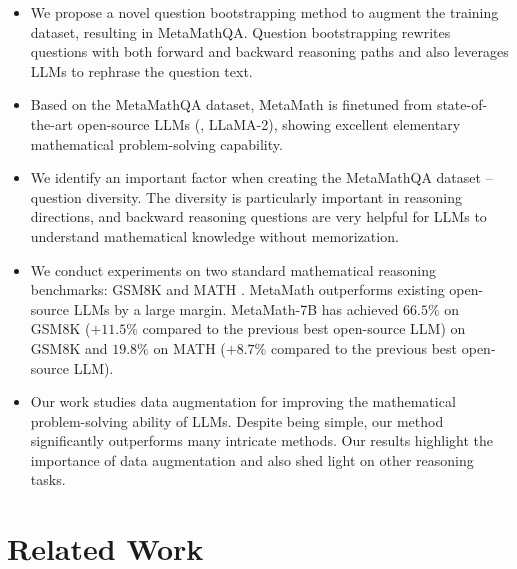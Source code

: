     \begin{itemize}[leftmargin=*,nosep]
    \setlength\itemsep{0.28em}
        \item We propose a novel question bootstrapping method to augment the training dataset, resulting in MetaMathQA. Question bootstrapping rewrites questions with both forward and backward reasoning paths and also leverages LLMs to rephrase the question text.
        \item Based on the MetaMathQA dataset, MetaMath is finetuned from state-of-the-art open-source LLMs (\eg, LLaMA-2), showing excellent elementary mathematical problem-solving capability.
        \item We identify an important factor when creating the MetaMathQA dataset -- question diversity. The diversity is particularly important in reasoning directions, and backward reasoning questions are very helpful for LLMs to understand mathematical knowledge without memorization.
        \item We conduct experiments on two standard mathematical reasoning benchmarks: GSM8K \citep{cobbe2021training} and MATH \citep{hendrycks2021measuring}.  MetaMath outperforms existing open-source LLMs by a large margin. MetaMath-7B has achieved $66.5\%$ on GSM8K ($+11.5\%$ compared to the previous best open-source LLM) on GSM8K and $19.8\%$ on MATH ($+8.7\%$ compared to the previous best open-source LLM).
        \item Our work studies data augmentation for improving the mathematical problem-solving ability of LLMs. Despite being simple, our method significantly outperforms many intricate methods. Our results highlight the importance of data augmentation and also shed light on other reasoning tasks.
    \end{itemize}
		
    \vspace{-2mm}
    \section{Related Work}
    \vspace{-2mm}

